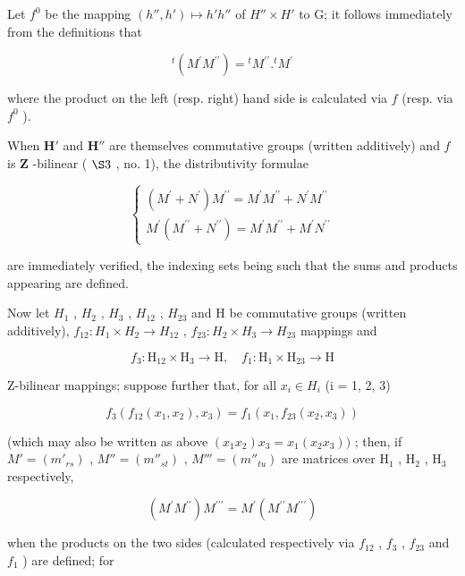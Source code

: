 Let \(f^0\) be the mapping \((h'', h') \mapsto h'h''\) of \(H'' \times H'\) to G; it follows immediately from the definitions that

\[
{ } ^ { t } ( M ^ { \prime } M ^ { \prime \prime } ) = { } ^ { t } M ^ { \prime \prime } . { } ^ { t } M ^ { \prime }\tag{4}
\]

where the product on the left (resp. right) hand side is calculated via \(f\) (resp. via \(f^0\) ).

When \(\mathbf{H}'\) and \(\mathbf{H}''\) are themselves commutative groups (written additively) and \(f\) is \(\mathbf{Z}\) -bilinear ( \(\S 3\) , no. 1), the distributivity formulae

\[
\left\{ \begin{array}{l} (M ^ {\prime} + N ^ {\prime}) M ^ {\prime \prime} = M ^ {\prime} M ^ {\prime \prime} + N ^ {\prime} M ^ {\prime \prime} \\ M ^ {\prime} (M ^ {\prime \prime} + N ^ {\prime \prime}) = M ^ {\prime} M ^ {\prime \prime} + M ^ {\prime} N ^ {\prime \prime} \end{array} \right.\tag{5}
\]

are immediately verified, the indexing sets being such that the sums and products appearing are defined.

Now let \(H_{1}\) , \(H_{2}\) , \(H_{3}\) , \(H_{12}\) , \(H_{23}\) and H be commutative groups (written additively), \(f_{12}:H_{1} \times H_{2} \to H_{12}\) , \(f_{23}:H_{2} \times H_{3} \to H_{23}\) mappings and

\[
f _ {3}: \mathrm{H} _ {1 2} \times \mathrm{H} _ {3} \rightarrow \mathrm{H}, \quad f _ {1}: \mathrm{H} _ {1} \times \mathrm{H} _ {2 3} \rightarrow \mathrm{H}
\]

Z-bilinear mappings; suppose further that, for all \(x_{i} \in H_{i}\) (i = 1, 2, 3)

\[
f _ {3} (f _ {1 2} (x _ {1}, x _ {2}), x _ {3}) = f _ {1} (x _ {1}, f _ {2 3} (x _ {2}, x _ {3}))
\]

(which may also be written as above \((x_{1}x_{2})x_{3} = x_{1}(x_{2}x_{3}))\) ; then, if \(M' = (m'_{rs})\) , \(M'' = (m''_{st})\) , \(M''' = (m''_{tu})\) are matrices over \(\mathrm{H}_1\) , \(\mathrm{H}_2\) , \(\mathrm{H}_3\) respectively,

\[
(M ^ {\prime} M ^ {\prime \prime}) M ^ {\prime \prime \prime} = M ^ {\prime} (M ^ {\prime \prime} M ^ {\prime \prime \prime})\tag{6}
\]

when the products on the two sides (calculated respectively via \(f_{12}\) , \(f_{3}\) , \(f_{23}\) and \(f_{1}\) ) are defined; for

